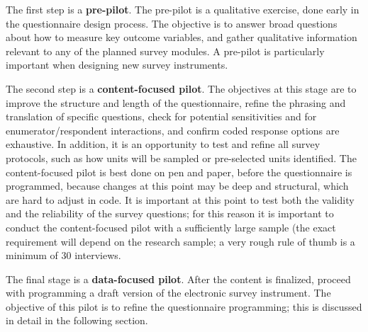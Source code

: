 The first step is a \textbf{pre-pilot}.
The pre-pilot is a qualitative exercise, done early in the questionnaire design process.
The objective is to answer broad questions about how to measure key outcome variables,
and gather qualitative information relevant to any of the planned survey modules.
A pre-pilot is particularly important when designing new survey instruments.

The second step is a \textbf{content-focused pilot}.
The objectives at this stage are to improve the structure and length of the questionnaire,
refine the phrasing and translation of specific questions,
check for potential sensitivities and for enumerator/respondent interactions,
and confirm coded response options are exhaustive.
In addition, it is an opportunity to test and refine all survey protocols,
such as how units will be sampled or pre-selected units identified.
The content-focused pilot is best done on pen and paper, before the questionnaire is programmed,
because changes at this point may be deep and structural,
which are hard to adjust in code.
It is important at this point to test both the validity and the reliability
of the survey questions;
for this reason it is important to conduct the content-focused pilot
with a sufficiently large sample (the exact requirement will depend on the research sample;
a very rough rule of thumb is a minimum of 30 interviews.

The final stage is a \textbf{data-focused pilot}.
After the content is finalized, proceed with programming a draft version
of the electronic survey instrument.
The objective of this pilot is to refine the questionnaire programming;
this is discussed in detail in the following section.


